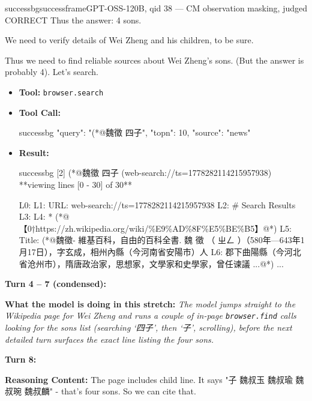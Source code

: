 \begin{casebox}{successbg}{successframe}{GPT-OSS-120B, qid 38 --- CM observation masking, judged CORRECT}
Thus the answer: 4 sons.

We need to verify details of Wei Zheng and his children, to be sure.

Thus we need to find reliable sources about Wei Zheng's sons. (But the answer is probably 4). Let's search.

\vspace{0.3em}
\begin{itemize}[nosep, leftmargin=*, label={}]
    \item \textbf{Tool:} \texttt{browser.search}
    \item \textbf{Tool Call:}
    \vspace{-0.5em}
    \begin{toolcall}{successbg}
{"query": "(*@魏徵 四子", "topn": 10, "source": "news"}
    \end{toolcall}
    \vspace{-0.5em}
    \item \textbf{Result:}
    \vspace{-0.5em}
    \begin{casecode}{successbg}
[2] (*@魏徵 四子 (web-search://ts=1778282114215957938)
**viewing lines [0 - 30] of 30**

L0: 
L1: URL: web-search://ts=1778282114215957938
L2: \# Search Results
L3:
L4:   * (*@【0†https://zh.wikipedia.org/wiki/\%E9\%AD\%8F\%E5\%BE\%B5】@*)
L5:  Title: (*@魏徵- 維基百科，自由的百科全書. 魏 徵 （ ㄓㄥ ）（580年—643年1月17日），字玄成，相州內縣（今河南省安陽市）人
L6: 郡下曲陽縣（今河北省沧州市），隋唐政治家，思想家，文學家和史學家，曾任谏議 ...@*)
...
    \end{casecode}
\end{itemize}
\vspace{1em}

\textbf{Turn 4 -- 7 (condensed):}

\textbf{What the model is doing in this stretch:} \emph{The model jumps straight to the Wikipedia page for Wei Zheng and runs a couple of in-page \texttt{browser.find} calls looking for the sons list (searching `{四子}', then `{子}', scrolling), before the next detailed turn surfaces the exact line listing the four sons.}

\vspace{1em}

\textbf{Turn 8:}

\textbf{Reasoning Content:} The page includes child line. It says "子 魏叔玉 魏叔瑜 魏叔琬 魏叔麟" - that's four sons. So we can cite that.


\end{casebox}

